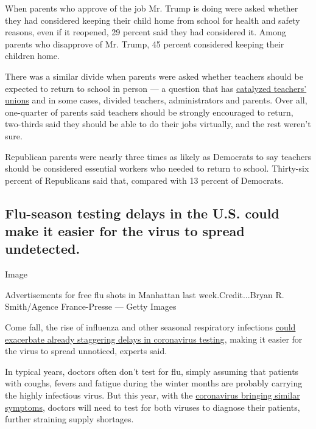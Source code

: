 When parents who approve of the job Mr. Trump is doing were asked
whether they had considered keeping their child home from school for
health and safety reasons, even if it reopened, 29 percent said they had
considered it. Among parents who disapprove of Mr. Trump, 45 percent
considered keeping their children home.

There was a similar divide when parents were asked whether teachers
should be expected to return to school in person --- a question that has
\href{https://www.nytimes3xbfgragh.onion/2020/07/29/us/teacher-union-school-reopening-coronavirus.html}{catalyzed
teachers' unions} and in some cases, divided teachers, administrators
and parents. Over all, one-quarter of parents said teachers should be
strongly encouraged to return, two-thirds said they should be able to do
their jobs virtually, and the rest weren't sure.

Republican parents were nearly three times as likely as Democrats to say
teachers should be considered essential workers who needed to return to
school. Thirty-six percent of Republicans said that, compared with 13
percent of Democrats.

\hypertarget{flu-season-testing-delays-in-the-us-could-make-it-easier-for-the-virus-to-spread-undetected}{%
\subsection{Flu-season testing delays in the U.S. could make it easier
for the virus to spread
undetected.}\label{flu-season-testing-delays-in-the-us-could-make-it-easier-for-the-virus-to-spread-undetected}}

Image

Advertisements for free flu shots in Manhattan last week.Credit...Bryan
R. Smith/Agence France-Presse --- Getty Images

Come fall, the rise of influenza and other seasonal respiratory
infections
\href{https://www.nytimes3xbfgragh.onion/2020/08/25/health/coronavirus-flu-testing.html}{could
exacerbate already staggering delays in coronavirus testing}, making it
easier for the virus to spread unnoticed, experts said.

In typical years, doctors often don't test for flu, simply assuming that
patients with coughs, fevers and fatigue during the winter months are
probably carrying the highly infectious virus. But this year, with the
\href{https://www.nytimes3xbfgragh.onion/interactive/2020/08/05/well/covid-19-symptoms.html}{coronavirus
bringing similar symptoms}, doctors will need to test for both viruses
to diagnose their patients, further straining supply shortages.

